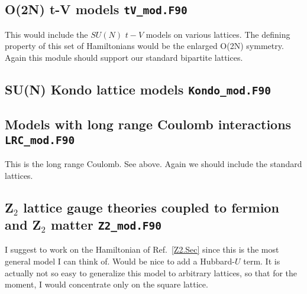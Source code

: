 \subsection{  O(2N)  t-V models  \texttt{tV\_mod.F90}}

This would include the $SU(N)$  $t-V$ models on various lattices.  The defining property of this set of Hamiltonians would be the enlarged O(2N) symmetry.  Again  this   module should support our standard bipartite lattices. 

\subsection{  SU(N) Kondo lattice models  \texttt{Kondo\_mod.F90}}


\subsection{  Models with long range Coulomb interactions  \texttt{LRC\_mod.F90}}

This is the long range Coulomb. See above.    Again we should include the   standard lattices. 

\subsection{Z$_2$ lattice gauge theories coupled to fermion and  Z$_2$ matter    \texttt{Z2\_mod.F90}}
I suggest to work on the  Hamiltonian of Ref.~\ref{Z2.Sec} since this is the most general  model I can think of.   Would be nice to add a Hubbard-$U$ term.  It is actually not so easy to generalize this model to 
arbitrary lattices, so that for the moment, I would concentrate only on the square lattice. 
